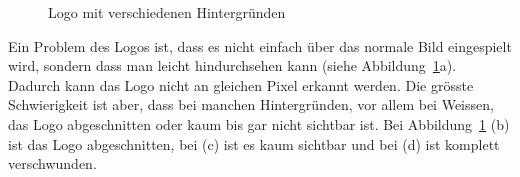 \documentclass[12pt,a4paper]{report}
\begin{document}
\begin{figure}[h]%
    \centering
    \qquad
    \qquad
    \qquad
    \caption{Logo mit verschiedenen Hintergründen}%
    \label{fig:logo2}%
\end{figure}

Ein Problem des Logos ist, dass es nicht einfach über das normale Bild eingespielt wird, sondern dass man leicht hindurchsehen kann (siehe Abbildung~\ref{fig:logo2}a).
Dadurch kann das Logo nicht an gleichen Pixel erkannt werden.
Die grösste Schwierigkeit ist aber, dass bei manchen Hintergründen, vor allem bei Weissen, das Logo abgeschnitten oder kaum bis gar nicht sichtbar ist.
Bei Abbildung~\ref{fig:logo2} (b) ist das Logo abgeschnitten, bei (c) ist es kaum sichtbar und bei (d) ist komplett verschwunden.
\end{document}
